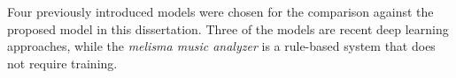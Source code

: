 
Four previously introduced models were chosen for the
comparison against the proposed model in this dissertation.
Three of the models are recent deep learning approaches,
while the \emph{melisma music analyzer} is a rule-based
system that does not require training.

